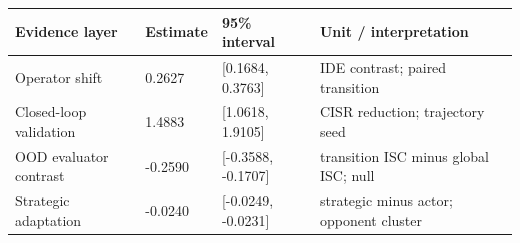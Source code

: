 \begin{tabular}{llll}
\toprule
Evidence layer & Estimate & 95\% interval & Unit / interpretation \\
\midrule
Operator shift & 0.2627 & [0.1684, 0.3763] & IDE contrast; paired transition \\
Closed-loop validation & 1.4883 & [1.0618, 1.9105] & CISR reduction; trajectory seed \\
OOD evaluator contrast & -0.2590 & [-0.3588, -0.1707] & transition ISC minus global ISC; null \\
Strategic adaptation & -0.0240 & [-0.0249, -0.0231] & strategic minus actor; opponent cluster \\
\bottomrule
\end{tabular}
